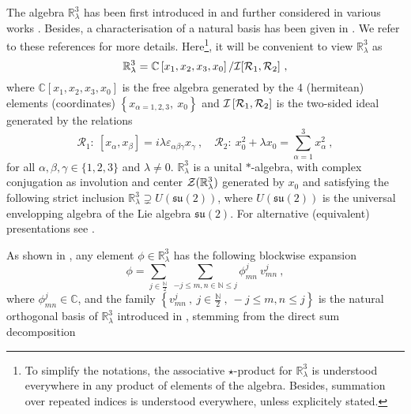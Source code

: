 \documentclass[a4paper,11pt,twoside]{article}
\numberwithin{equation}{section}
\theoremstyle{nonumberplain}
\newcounter{and}
\begin{document}
The algebra $\mathbb{R}^3_\lambda$ has been first introduced in \cite{Hammaa} and further considered in various works \cite{selene,vit-wal-12,gervitwal-13}. Besides, a characterisation of a natural basis has been given in \cite{vit-wal-12}. We refer to these references for more details. Here{\footnote{To simplify the notations, the associative $\star$-product for $\mathbb{R}^3_\lambda$ is understood everywhere in any product of elements of the algebra. Besides, summation over repeated indices is understood everywhere, unless explicitely stated.}}, it will be convenient to view $\mathbb{R}^3_\lambda$ as \cite{vit-wal-12,gervitwal-13}%
%
\begin{equation}
\mathbb{R}^3_\lambda=\mathbb{C}\left[x_1,x_2,x_3,x_0\right]/{\mathcal{I}}[{\mathcal{R}}_1,{\cal{R}}_2] \ , \label{defining} 
\end{equation}
%
where $\mathbb{C}\left[x_1,x_2,x_3,x_0\right]$ is the free algebra generated by the 4 (hermitean) elements (coordinates) $\left\{x_{\alpha=1,2,3},\ x_0\right\}$ and ${\mathcal{I}}\left[{\mathcal{R}}_1,{\cal{R}}_2\right]$ is the two-sided ideal generated by the relations%
%
\begin{equation}
{\mathcal{R}}_1: \ [x_\alpha,x_\beta] = i \lambda \varepsilon_{\alpha\beta\gamma} x_\gamma \ , \quad
{\mathcal{R}}_2: \ x_0^2 + \lambda x_0 = \sum_{\alpha=1}^3 x_\alpha^2 \ , \label{relat1}
\end{equation}
%
for all $\alpha,\beta,\gamma \in \{1,2,3\}$ and $\lambda\ne0$. $\mathbb{R}^3_\lambda$ is a unital $*$-algebra, with complex conjugation as involution and center ${\cal{Z}}(\mathbb{R}^3_\lambda)$ generated by $x_0$ and satisfying the following strict inclusion $\mathbb{R}^3_\lambda\supsetneq U(\mathfrak{su}(2))$, where $U(\mathfrak{su}(2))$ is the universal envelopping algebra of the Lie algebra ${\mathfrak{su}}(2)$. For alternative (equivalent) presentations see \cite{selene, vit-wal-12, gervitwal-13}.\par%
%
As shown in \cite{vit-wal-12}, any element $\phi\in\mathbb{R}^3_\lambda$ has the following blockwise expansion%
%
\begin{equation}
\phi = \sum_{j\in\frac{\mathbb{N}}{2}} \ \sum_{-j\le m,n\in\mathbb{N}\le j} \phi^j_{mn} \ v^j_{mn} \ , \label{nat-fourier}
\end{equation}
%
where $\phi^j_{mn}\in\mathbb{C}$, and the family $\left\{v^j_{mn} \ , \ j\in\frac{\mathbb{N}}{2} \ ,\ -j\le m,n\le j \right\}$ is the natural orthogonal basis of $\mathbb{R}^3_\lambda$ introduced in \cite{vit-wal-12}, stemming from the direct sum decomposition%
\end{document}
